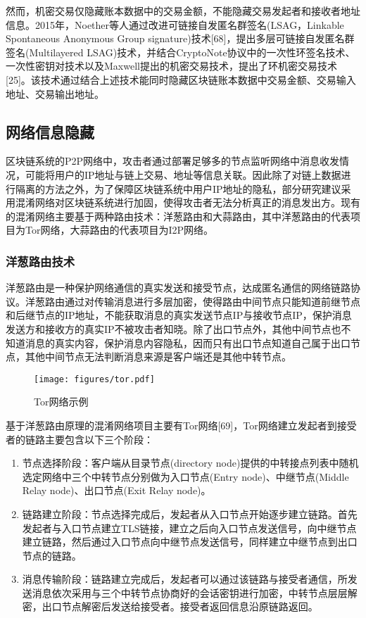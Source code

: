 然而，机密交易仅隐藏账本数据中的交易金额，不能隐藏交易发起者和接收者地址信息。2015年，Noether等人通过改进可链接自发匿名群签名(LSAG，Linkable Spontaneous Anonymous Group signature)技术[68]，提出多层可链接自发匿名群签名(Multilayered LSAG)技术，并结合CryptoNote协议中的一次性环签名技术、一次性密钥对技术以及Maxwell提出的机密交易技术，提出了环机密交易技术[25]。该技术通过结合上述技术能同时隐藏区块链账本数据中交易金额、交易输入地址、交易输出地址。

\subsection{网络信息隐藏}

区块链系统的P2P网络中，攻击者通过部署足够多的节点监听网络中消息收发情况，可能将用户的IP地址与链上交易、地址等信息关联。因此除了对链上数据进行隔离的方法之外，为了保障区块链系统中用户IP地址的隐私，部分研究建议采用混淆网络对区块链系统进行加固，使得攻击者无法分析真正的消息发出方。现有的混淆网络主要基于两种路由技术：洋葱路由和大蒜路由，其中洋葱路由的代表项目为Tor网络，大蒜路由的代表项目为I2P网络。

\subsubsection{洋葱路由技术}

洋葱路由是一种保护网络通信的真实发送和接受节点，达成匿名通信的网络链路协议。洋葱路由通过对传输消息进行多层加密，使得路由中间节点只能知道前继节点和后继节点的IP地址，不能获取消息的真实发送节点IP与接收节点IP，保护消息发送方和接收方的真实IP不被攻击者知晓。除了出口节点外，其他中间节点也不知道消息的真实内容，保护消息内容隐私，因而只有出口节点知道自己属于出口节点，其他中间节点无法判断消息来源是客户端还是其他中转节点。

\begin{figure}
\centering
\texttt{[image: figures/tor.pdf]}
\caption{Tor网络示例}
\label{fig:tor}
\end{figure}

基于洋葱路由原理的混淆网络项目主要有Tor网络[69]，Tor网络建立发起者到接受者的链路主要包含以下三个阶段：

\begin{enumerate}
	\item 节点选择阶段：客户端从目录节点(directory node)提供的中转接点列表中随机选定网络中三个中转节点分别做为入口节点(Entry node)、中继节点(Middle Relay node)、出口节点(Exit Relay node)。
	\item 链路建立阶段：节点选择完成后，发起者从入口节点开始逐步建立链路。首先发起者与入口节点建立TLS链接，建立之后向入口节点发送信号，向中继节点建立链路，然后通过入口节点向中继节点发送信号，同样建立中继节点到出口节点的链路。
	\item 消息传输阶段：链路建立完成后，发起者可以通过该链路与接受者通信，所发送消息依次采用与三个中转节点协商好的会话密钥进行加密，中转节点层层解密，出口节点解密后发送给接受者。接受者返回信息沿原链路返回。
\end{enumerate}

